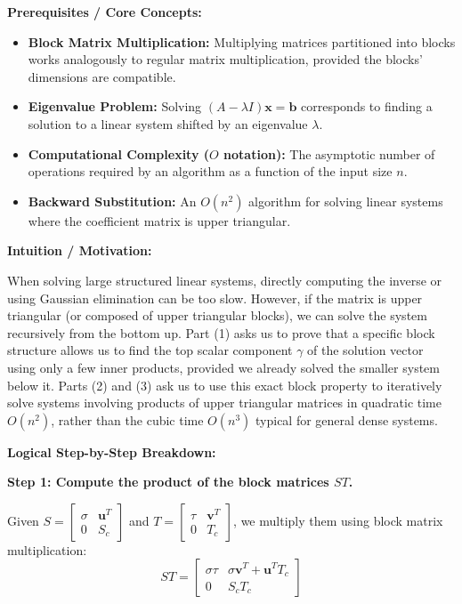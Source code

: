 \begin{solution}
\textbf{Prerequisites / Core Concepts:}
\begin{itemize}
    \item \textbf{Block Matrix Multiplication:} Multiplying matrices partitioned into blocks works analogously to regular matrix multiplication, provided the blocks' dimensions are compatible.
    \item \textbf{Eigenvalue Problem:} Solving $(A - \lambda I)\mathbf{x} = \mathbf{b}$ corresponds to finding a solution to a linear system shifted by an eigenvalue $\lambda$.
    \item \textbf{Computational Complexity ($O$ notation):} The asymptotic number of operations required by an algorithm as a function of the input size $n$.
    \item \textbf{Backward Substitution:} An $O(n^2)$ algorithm for solving linear systems where the coefficient matrix is upper triangular.
\end{itemize}

\textbf{Intuition / Motivation:}

When solving large structured linear systems, directly computing the inverse or using Gaussian elimination can be too slow. However, if the matrix is upper triangular (or composed of upper triangular blocks), we can solve the system recursively from the bottom up. Part (1) asks us to prove that a specific block structure allows us to find the top scalar component $\gamma$ of the solution vector using only a few inner products, provided we already solved the smaller system below it. Parts (2) and (3) ask us to use this exact block property to iteratively solve systems involving products of upper triangular matrices in quadratic time $O(n^2)$, rather than the cubic time $O(n^3)$ typical for general dense systems.

\textbf{Logical Step-by-Step Breakdown:}

\textbf{Step 1: Compute the product of the block matrices $ST$.}

Given $S = \begin{bmatrix} \sigma & \mathbf{u}^T \\ 0 & S_c \end{bmatrix}$ and $T = \begin{bmatrix} \tau & \mathbf{v}^T \\ 0 & T_c \end{bmatrix}$, we multiply them using block matrix multiplication:
\[ ST = \begin{bmatrix} \sigma \tau & \sigma \mathbf{v}^T + \mathbf{u}^T T_c \\ 0 & S_c T_c \end{bmatrix} \]


\end{solution}
